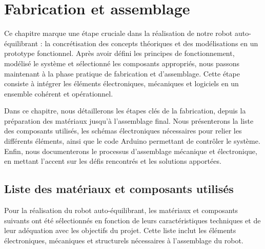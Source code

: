 \documentclass{report}
\begin{document}
\chapter{Fabrication et assemblage}

Ce chapitre marque une étape cruciale dans la réalisation de notre robot auto-équilibrant : la concrétisation des concepts théoriques et des modélisations en un prototype fonctionnel. Après avoir défini les principes de fonctionnement, modélisé le système et sélectionné les composants appropriés, nous passons maintenant à la phase pratique de fabrication et d'assemblage. Cette étape consiste à intégrer les éléments électroniques, mécaniques et logiciels en un ensemble cohérent et opérationnel.

Dans ce chapitre, nous détaillerons les étapes clés de la fabrication, depuis la préparation des matériaux jusqu'à l'assemblage final. Nous présenterons la liste des composants utilisés, les schémas électroniques nécessaires pour relier les différents éléments, ainsi que le code Arduino permettant de contrôler le système. Enfin, nous documenterons le processus d'assemblage mécanique et électronique, en mettant l'accent sur les défis rencontrés et les solutions apportées.
\section{Liste des matériaux et composants utilisés}
Pour la réalisation du robot auto-équilibrant, les matériaux et composants suivants ont été sélectionnés en fonction de leurs caractéristiques techniques et de leur adéquation avec les objectifs du projet. Cette liste inclut les éléments électroniques, mécaniques et structurels nécessaires à l'assemblage du robot.
\end{document}
